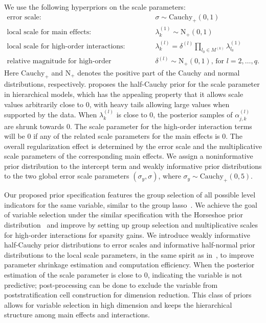 \documentclass[11pt]{article}
\numberwithin{figure}{section}
\numberwithin{table}{section}
\numberwithin{equation}{section}
\begin{document}
We use the following hyperpriors on the scale parameters: \begin{align}
  \label{main} \nonumber  \mbox{error scale: }&\sigma \sim
  \textrm{Cauchy}_{+}(0,1) \\ \nonumber \mbox{local scale for main effects: } &
  \lambda_k^{(1)} \sim  \textrm{N}_{+}(0,1)\\ \nonumber	 \mbox{local scale for
  high-order interactions: } & \lambda^{(l)}_k=\delta^{(l)}\prod_{l_0\in
  M^{(k)}}\lambda^{(1)}_{l_0} \\ \mbox{relative magnitude for high-order
  interactions: }&\delta^{(l)}  \sim   \textrm{N}_{+}(0,1) \mbox{, for }
  l=2,\dots, q.  \end{align} Here $\textrm{Cauchy}_{+}$ and $\textrm{N}_{+}$
  denotes the positive part of the Cauchy and normal distributions,
  respectively.  \cite{gelman06-prior} proposes the half-Cauchy prior for the
  scale parameter in hierarchical models, which has the appealing property that
  it allows scale values arbitrarily close to 0, with heavy tails allowing
  large values when supported by the data. When $\lambda_k^{(l)}$ is close to
  0, the posterior samples of $\alpha_{j,k}^{(l)}$ are shrunk towards 0. The
  scale parameter for the high-order interaction terms will be 0 if any of the
  related scale parameters for the main effects is 0. The overall
  regularization effect is determined by the error scale and the multiplicative
  scale parameters of the corresponding main effects. We assign a
  noninformative prior distribution to the intercept term and weakly
  informative prior distributions to the two global error scale parameters
  $(\sigma_y, \sigma)$, where $\sigma_y\sim \textrm{Cauchy}_{+}(0,5)$.


Our proposed prior specification features the group selection of all possible
level indicators for the same variable, similar to the group
lasso~\citep{grouplasso06}. We achieve the goal of variable selection under the
similar specification with the Horseshoe prior distribution~\citep{horseshoe10}
and improve by setting up group selection and multiplicative scales for
high-order interactions for sparsity gains. We introduce weakly informative
half-Cauchy prior distributions to error scales and informative half-normal
prior distributions to the local scale parameters, in the same spirit as
in~\cite{hyperprior:Aki16}, to improve parameter shrinkage estimation and
computation efficiency. When the posterior estimation of the scale parameter is
close to 0, indicating the variable is not predictive; post-processing can be
done to exclude the variable from poststratification cell construction for
dimension reduction. This class of priors allows for variable selection in high
dimension and keeps the hierarchical structure among main effects and
interactions.
 
\end{document}
